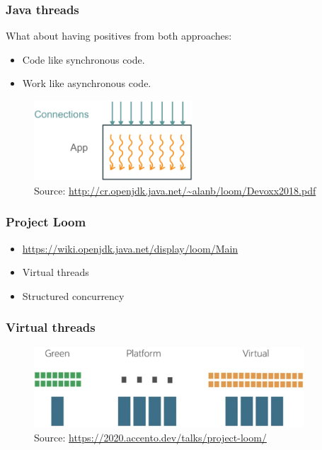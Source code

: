 \documentclass[10pt,utf8]{beamer}
\begin{document}
\begin{frame}
    \frametitle{Java threads}
    What about having positives from both approaches:
    \begin{itemize}
        \item Code like synchronous code.
        \item Work like asynchronous code.
    \end{itemize}
    
    \begin{figure}
        \centering
        \includegraphics[height=3cm]{./img/virt_threads.eps}
        \caption{\tiny{Source: \url{http://cr.openjdk.java.net/~alanb/loom/Devoxx2018.pdf}}}
    \end{figure}
\end{frame}

\begin{frame}
  \frametitle{Project Loom}
	\begin{itemize}
		\item \url{https://wiki.openjdk.java.net/display/loom/Main}
		\item Virtual threads
		\item Structured concurrency
	\end{itemize}
\end{frame}

\begin{frame}
    \frametitle{Virtual threads}
    \begin{figure}
        \centering
        \includegraphics[height=3cm]{./img/thread_history.eps}
        \caption{\tiny{Source: \url{https://2020.accento.dev/talks/project-loom/}}}
    \end{figure}
\end{frame}
\end{document}
